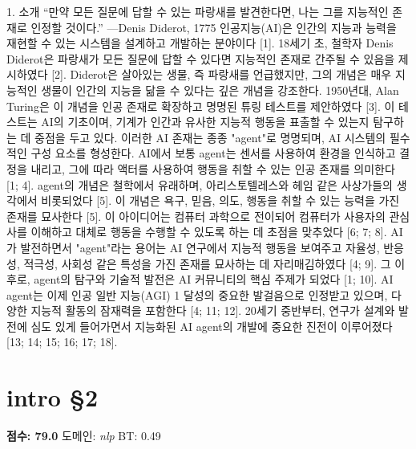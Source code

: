 \documentclass[11pt,a4paper,oneside]{memoir}
\begin{document}
\begin{tcolorbox}[kostyle]
1. 소개
“만약 모든 질문에 답할 수 있는 파랑새를 발견한다면, 나는 그를 지능적인 존재로 인정할 것이다.” —Denis Diderot, 1775  
인공지능(AI)은 인간의 지능과 능력을 재현할 수 있는 시스템을 설계하고 개발하는 분야이다 [1]. 18세기 초, 철학자 Denis Diderot은 파랑새가 모든 질문에 답할 수 있다면 지능적인 존재로 간주될 수 있음을 제시하였다 [2]. Diderot은 살아있는 생물, 즉 파랑새를 언급했지만, 그의 개념은 매우 지능적인 생물이 인간의 지능을 닮을 수 있다는 깊은 개념을 강조한다. 1950년대, Alan Turing은 이 개념을 인공 존재로 확장하고 명명된 튜링 테스트를 제안하였다 [3]. 이 테스트는 AI의 기초이며, 기계가 인간과 유사한 지능적 행동을 표출할 수 있는지 탐구하는 데 중점을 두고 있다. 이러한 AI 존재는 종종 "agent"로 명명되며, AI 시스템의 필수적인 구성 요소를 형성한다. AI에서 보통 agent는 센서를 사용하여 환경을 인식하고 결정을 내리고, 그에 따라 액터를 사용하여 행동을 취할 수 있는 인공 존재를 의미한다 [1; 4]. agent의 개념은 철학에서 유래하며, 아리스토텔레스와 헤임 같은 사상가들의 생각에서 비롯되었다 [5]. 이 개념은 욕구, 믿음, 의도, 행동을 취할 수 있는 능력을 가진 존재를 묘사한다 [5]. 이 아이디어는 컴퓨터 과학으로 전이되어 컴퓨터가 사용자의 관심사를 이해하고 대체로 행동을 수행할 수 있도록 하는 데 초점을 맞추었다 [6; 7; 8]. AI가 발전하면서 "agent"라는 용어는 AI 연구에서 지능적 행동을 보여주고 자율성, 반응성, 적극성, 사회성 같은 특성을 가진 존재를 묘사하는 데 자리매김하였다 [4; 9]. 그 이후로, agent의 탐구와 기술적 발전은 AI 커뮤니티의 핵심 주제가 되었다 [1; 10]. AI agent는 이제 인공 일반 지능(AGI) 1 달성의 중요한 발걸음으로 인정받고 있으며, 다양한 지능적 활동의 잠재력을 포함한다 [4; 11; 12]. 20세기 중반부터, 연구가 설계와 발전에 심도 있게 들어가면서 지능화된 AI agent의 개발에 중요한 진전이 이루어졌다 [13; 14; 15; 16; 17; 18].
\end{tcolorbox}
\vspace{0.8em}

\section{intro §2}
\noindent \textbf{\color{ScoreGreen}점수: 79.0} \quad 도메인: \textit{nlp}  \quad \textcolor{ScoreRed}{BT: 0.49}
\vspace{0.4em}
\end{document}
